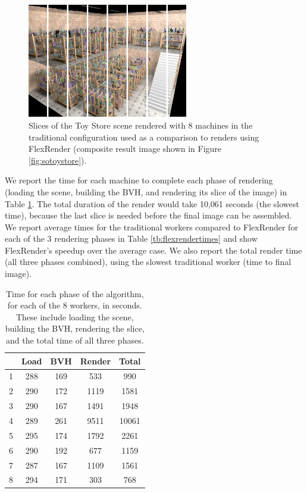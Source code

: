 \documentclass[a4paper,twoside]{article}
\begin{document}
\begin{figure}[h!]
    \centering
    \includegraphics[width=70mm]{images/toystore-sliced.png}
    \caption{Slices of the Toy Store scene rendered with 8 machines in the traditional configuration used as a comparison to renders using FlexRender (composite result image shown in Figure \ref{fig:sotoystore}).}
    \label{fig:toystoresliced}
\end{figure}

We report the time for each machine to complete each phase of rendering (loading
the scene, building the BVH, and rendering its slice of the image) in Table
\ref{tb:traditionaltimes}. The total duration of the render would take 10,061
seconds (the slowest time), because the last slice is needed before the final
image can be assembled. We report average times for the traditional workers
compared to FlexRender for each of the 3 rendering phases in Table
\ref{tb:flexrendertimes} and show FlexRender's speedup over the average case.
We also report the total render time (all three phases combined), using the
slowest traditional worker (time to final image).

\begin{table}
\begin{center}
\begin{tabular}{|l||c|c|c||c|}
    \hline
    & Load & BVH & Render & \textbf{Total}\\
    \hline
    \hline
    1 & 288 & 169 & 533 & 990 \\
    \hline
    2 & 290 & 172 & 1119 & 1581 \\
    \hline
    3 & 290 & 167 & 1491 & 1948 \\
    \hline
    4 & 289 & 261 & 9511 & 10061 \\
    \hline
    5 & 295 & 174 & 1792 & 2261 \\
    \hline
    6 & 290 & 192 & 677 & 1159 \\
    \hline
    7 & 287 & 167 & 1109 & 1561 \\
    \hline
    8 & 294 & 171 & 303 & 768 \\
    \hline
\end{tabular}
\caption{Time for each phase of the algorithm, for each of the 8 workers, in seconds. These include loading the scene, building the BVH, rendering the slice, and the total time of all three phases.}
\label{tb:traditionaltimes}
\end{center}
\end{table}
\end{document}
